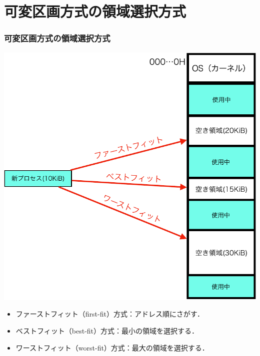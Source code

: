\documentclass{beamer}                   %
\begin{document}
\section{可変区画方式の領域選択方式}
\begin{frame}
  \frametitle{可変区画方式の領域選択方式}
  \begin{center}
    \includegraphics[scale=0.4]{Fig/firstBestWorstFit-crop.pdf}\\
  \end{center}
  \begin{itemize}
  \item ファーストフィット（first-fit）方式：アドレス順にさがす．
  \item ベストフィット（best-fit）方式：最小の領域を選択する．
  \item ワーストフィット（worst-fit）方式：最大の領域を選択する．
  \end{itemize}
\end{frame}
\end{document}
